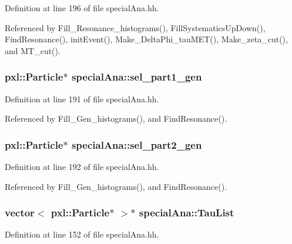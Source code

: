 Definition at line 196 of file special\-Ana.\-hh.



Referenced by Fill\-\_\-\-Resonance\-\_\-histograms(), Fill\-Systematics\-Up\-Down(), Find\-Resonance(), init\-Event(), Make\-\_\-\-Delta\-Phi\-\_\-tau\-M\-E\-T(), Make\-\_\-zeta\-\_\-cut(), and M\-T\-\_\-cut().

\subsubsection[{sel\-\_\-part1\-\_\-gen}]{\setlength{\rightskip}{0pt plus 5cm}pxl\-::\-Particle$\ast$ special\-Ana\-::sel\-\_\-part1\-\_\-gen}\label{classspecialAna_a9beb30fa9c4671d0b5d6a35df0470fa8}


Definition at line 191 of file special\-Ana.\-hh.



Referenced by Fill\-\_\-\-Gen\-\_\-histograms(), and Find\-Resonance().

\subsubsection[{sel\-\_\-part2\-\_\-gen}]{\setlength{\rightskip}{0pt plus 5cm}pxl\-::\-Particle$\ast$ special\-Ana\-::sel\-\_\-part2\-\_\-gen}\label{classspecialAna_a5e06d3c9b3b9dbd2353e7abf1645d32e}


Definition at line 192 of file special\-Ana.\-hh.



Referenced by Fill\-\_\-\-Gen\-\_\-histograms(), and Find\-Resonance().

\subsubsection[{Tau\-List}]{\setlength{\rightskip}{0pt plus 5cm}vector$<$ pxl\-::\-Particle$\ast$ $>$$\ast$ special\-Ana\-::\-Tau\-List}\label{classspecialAna_a84140461ae32bd6482b36642714d2669}


Definition at line 152 of file special\-Ana.\-hh.




